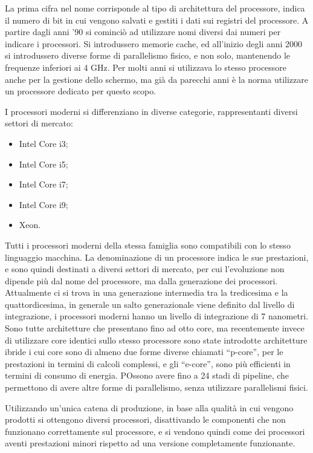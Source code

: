 \documentclass{article}
\numberwithin{equation}{subsection}
\begin{document}
La prima cifra nel nome corrisponde al tipo di architettura del processore, indica il numero di bit in cui vengono salvati e gestiti i dati sui registri del processore. 
A partire dagli anni '90 si cominciò ad utilizzare nomi diversi dai numeri per indicare i processori. Si introdussero memorie cache, ed all'inizio degli anni 2000 si introdussero 
diverse forme di parallelismo fisico, e non solo, mantenendo le frequenze inferiori ai 4 GHz. Per molti anni si utilizzava lo stesso processore anche per la gestione 
dello schermo, ma già da parecchi anni è la norma utilizzare un processore dedicato per questo scopo. 

I processori moderni si differenziano in diverse categorie, rappresentanti diversi settori di mercato:
\begin{itemize}
    \item Intel Core i3;
    \item Intel Core i5;
    \item Intel Core i7;
    \item Intel Core i9;
    \item Xeon. 
\end{itemize}
Tutti i processori moderni della stessa famiglia sono compatibili con lo stesso linguaggio macchina. La denominazione di un processore indica le sue prestazioni, e sono 
quindi destinati a diversi settori di mercato, per cui l'evoluzione non dipende più dal nome del processore, ma dalla generazione dei processori. Attualmente ci si trova 
in una generazione intermedia tra la tredicesima e la quattordicesima, in generale un salto generazionale viene definito dal livello di integrazione, i processori moderni 
hanno un livello di integrazione di 7 nanometri. 
Sono tutte architetture che presentano fino ad otto core, ma recentemente invece di utilizzare core identici sullo stesso processore sono state introdotte architetture ibride 
i cui core sono di almeno due forme diverse chiamati ``p-core'', per le prestazioni in termini di calcoli complessi, e gli ``e-core'', sono più efficienti in termini di consumo 
di energia. POssono avere fino a 24 stadi di pipeline, che permettono di avere altre forme di parallelismo, senza utilizzare parallelismi fisici. 

Utilizzando un'unica catena di produzione, in base alla qualità in cui vengono prodotti si ottengono diversi processori, disattivando le componenti che non funzionano 
correttamente sul processore, e si vendono quindi come dei processori aventi prestazioni minori rispetto ad una versione completamente funzionante. 
\end{document}
